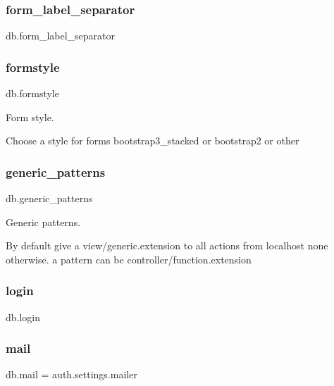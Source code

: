 \subsubsection{\texorpdfstring{form\+\_\+label\+\_\+separator}{form\_label\_separator}}
{\footnotesize\ttfamily db.\+form\+\_\+label\+\_\+separator}

\mbox{\label{namespacedb_ab68a30ce13011c7ceb6091ce5557ae1b}} 
\subsubsection{\texorpdfstring{formstyle}{formstyle}}
{\footnotesize\ttfamily db.\+formstyle}



Form style. 

Choose a style for forms \textquotesingle{}bootstrap3\+\_\+stacked\textquotesingle{} or \textquotesingle{}bootstrap2\textquotesingle{} or other \mbox{\label{namespacedb_ac1917cb3a4b16c7ac25158e93e51c52e}} 
\subsubsection{\texorpdfstring{generic\+\_\+patterns}{generic\_patterns}}
{\footnotesize\ttfamily db.\+generic\+\_\+patterns}



Generic patterns. 

By default give a view/generic.\+extension to all actions from localhost none otherwise. a pattern can be \textquotesingle{}controller/function.\+extension\textquotesingle{} \mbox{\label{namespacedb_a1b7fdd513c47aa3ec333ec122eaa392f}} 
\subsubsection{\texorpdfstring{login}{login}}
{\footnotesize\ttfamily db.\+login}

\mbox{\label{namespacedb_a39b72c0590643b096fd9f1429761100e}} 
\subsubsection{\texorpdfstring{mail}{mail}}
{\footnotesize\ttfamily db.\+mail = auth.\+settings.\+mailer}



